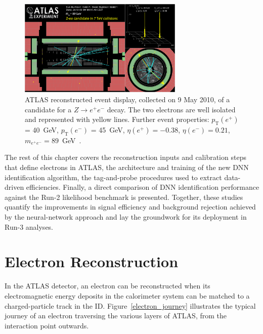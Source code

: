 \begin{figure}[htbp]
    \centering
    \includegraphics[width=0.7\textwidth]{images/Zee.png}
    \caption{ATLAS reconstructed event display, collected on 9 May 2010, of a candidate for a $Z\to e^+e^-$ decay. The two electrons are well isolated and represented with yellow lines. Further event properties: $p_{\text{T}}(e^{+})$ = 40~GeV, $p_{\text{T}}(e^{-})$ = 45~GeV, $\eta(e^{+}) = -0.38$, $\eta(e^{-}) = 0.21$, $m_{e^{+}e^{-}}=89$~GeV~\cite{atlas:eventdisplay}. }
    \label{fig:zee}
\end{figure}

The rest of this chapter covers the reconstruction inputs and calibration steps that define electrons in ATLAS, the architecture and training of the new DNN identification algorithm, the tag-and-probe procedures used to extract data-driven efficiencies. Finally, a direct comparison of DNN identification performance against the Run-2 likelihood benchmark is presented. Together, these studies quantify the improvements in signal efficiency and background rejection achieved by the neural-network approach and lay the groundwork for its deployment in Run-3 analyses.  

\section{Electron Reconstruction}
\label{sec:electron_reconstruction}

In the ATLAS detector, an electron can be reconstructed when its electromagnetic energy deposits in the calorimeter system can be matched to a charged-particle track in the ID. Figure~\ref{electron_journey} illustrates the typical journey of an electron traversing the various layers of ATLAS, from the interaction point outwards.

